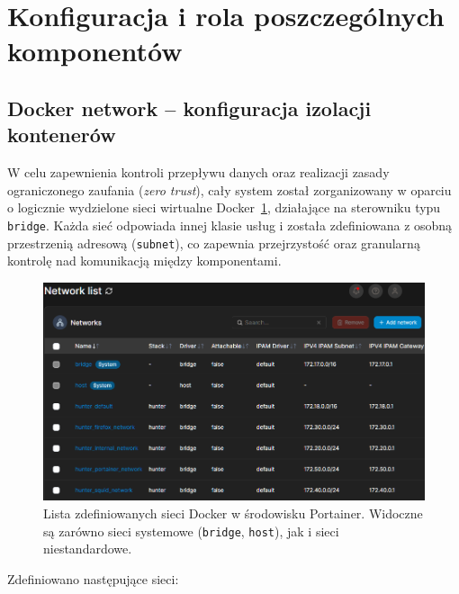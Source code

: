 \documentclass[
    left=2.5cm,         %
    right=2.5cm,        %
    top=2.5cm,          %
    bottom=3cm,         %
    bindingoffset=6mm,  %
    nohyphenation=true %
]{eiti/eiti-thesis} %
\begin{document}
\newpage 
\section{Konfiguracja i rola poszczególnych komponentów}

\subsection{Docker network – konfiguracja izolacji kontenerów}

W celu zapewnienia kontroli przepływu danych oraz realizacji zasady ograniczonego zaufania (\textit{zero trust}), cały system został zorganizowany w oparciu o logicznie wydzielone sieci wirtualne Docker~\ref{fig:docker-networks}, działające na sterowniku typu \texttt{bridge}. Każda sieć odpowiada innej klasie usług i została zdefiniowana z osobną przestrzenią adresową (\texttt{subnet}), co zapewnia przejrzystość oraz granularną kontrolę nad komunikacją między komponentami.
\begin{figure}[H]
    \centering
    \includegraphics[width=\textwidth]{img/docker_network.png}
    \caption{Lista zdefiniowanych sieci Docker w środowisku Portainer. Widoczne są zarówno sieci systemowe (\texttt{bridge}, \texttt{host}), jak i sieci niestandardowe.}
    \label{fig:docker-networks}
\end{figure}

Zdefiniowano następujące sieci:
\end{document}
